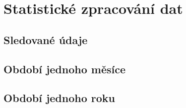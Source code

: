 \section{Statistické zpracování dat}



\subsection*{Sledované údaje}



\subsection*{Období jednoho měsíce}
\subsection*{Období jednoho roku}


